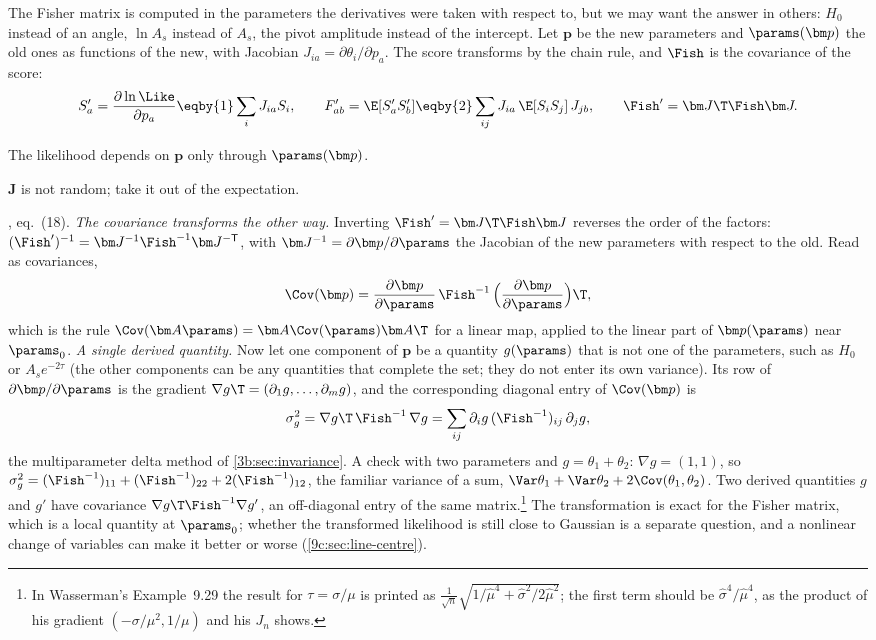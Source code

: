 The Fisher matrix is computed in the parameters the derivatives were taken with respect to, but we may want
the answer in others: $H_0$ instead of an angle, $\ln A_s$ instead of $A_s$, the pivot amplitude instead of
the intercept. Let $\bm p$ be the new parameters and $\params(\bm p)$ the old ones as functions of the new, with
Jacobian $J_{ia}=\partial\theta_i/\partial p_a$. The score transforms by the chain rule, and $\Fish$ is the
covariance of the score:
\begin{align}
  S'_a=\frac{\partial\ln\Like}{\partial p_a}
  \eqby{1}\sum_iJ_{ia}S_i,
  \qquad
  F'_{ab}=\E[S'_aS'_b]\eqby{2}\sum_{ij}J_{ia}\,\E[S_iS_j]\,J_{jb},
  \qquad
  \Fish'=\bm J\T\Fish\bm J .
  \label{10a:eq:jacobian}
\end{align}
\begin{explain}
  \item The likelihood depends on $\bm p$ only through $\params(\bm p)$.
  \item $\bm J$ is not random; take it out of the expectation.
\end{explain}
\cite{Coe2009}, eq.~(18). \emph{The covariance transforms the other way.} Inverting $\Fish'=\bm J\T\Fish\bm J$ reverses the order of the
factors: $(\Fish')^{-1}=\bm J^{-1}\Fish^{-1}\bm J^{-\mathsf T}$, with $\bm J^{-1}=\partial\bm p/\partial\params$ the Jacobian of the new
parameters with respect to the old. Read as covariances,
\[
  \Cov(\bm p)=\frac{\partial\bm p}{\partial\params}\,\Fish^{-1}\,\Bigl(\frac{\partial\bm p}{\partial\params}\Bigr)\T,
\]
which is the rule $\Cov(\bm A\params)=\bm A\Cov(\params)\bm A\T$ for a linear map, applied to the linear part of
$\bm p(\params)$ near $\params_0$. \emph{A single derived quantity.} Now let one component of $\bm p$ be a quantity
$g(\params)$ that is not one of the parameters, such as $H_0$ or $A_se^{-2\tau}$ (the other components can be any
quantities that complete the set; they do not enter its own variance). Its row of $\partial\bm p/\partial\params$ is
the gradient $\nabla g\T=(\partial_1g,\dots,\partial_mg)$, and the corresponding diagonal entry of $\Cov(\bm p)$ is
\[
  \sigma_g^2=\nabla g\T\,\Fish^{-1}\,\nabla g=\sum_{ij}\partial_ig\,(\Fish^{-1})_{ij}\,\partial_jg ,
\]
the multiparameter delta method  of \cref{3b:sec:invariance}. A check with two
parameters and $g=\theta_1+\theta_2$: $\nabla g=(1,1)$, so $\sigma_g^2=(\Fish^{-1})_{11}+(\Fish^{-1})_{22}+2(\Fish^{-1})_{12}$, the
familiar variance of a sum, $\Var\theta_1+\Var\theta_2+2\Cov(\theta_1,\theta_2)$. Two derived quantities $g$ and $g'$ have
covariance $\nabla g\T\Fish^{-1}\nabla g'$, an off-diagonal entry of the same matrix.\footnote{In Wasserman's Example~9.29 the result for
$\tau=\sigma/\mu$ is printed as $\frac1{\sqrt n}\sqrt{1/\hat\mu^4+\hat\sigma^2/2\hat\mu^2}$; the first term should be
$\hat\sigma^4/\hat\mu^4$, as the product of his gradient $(-\sigma/\mu^2,1/\mu)$ and his $J_n$ shows.} The
transformation is exact for the Fisher matrix, which is a local quantity at $\params_0$; whether the
transformed likelihood is still close to Gaussian is a separate question, and a nonlinear change of variables
can make it better or worse (\cref{9c:sec:line-centre}).

